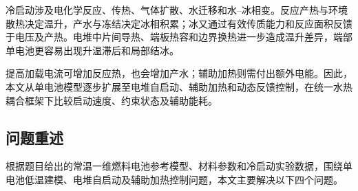 \documentclass[bwprint]{gmcmthesis}
\numberwithin{equation}{section}
\numberwithin{figure}{section}
\begin{document}
冷启动涉及电化学反应、传热、气体扩散、水迁移和水--冰相变。反应产热与环境散热决定温升，产水与冻结决定冰相积累；冰又通过有效传质能力和反应面积反馈于电压及产热。电堆中片间导热、端板热容和边界换热进一步造成温升差异，端部单电池更容易出现升温滞后和局部结冰。

提高加载电流可增加反应热，也会增加产水；辅助加热则需付出额外电能。因此，本文从单电池模型逐步扩展至电堆自启动、辅助加热和动态反馈控制，在统一水热耦合框架下比较启动速度、约束状态及辅助能耗。

\subsection{问题重述}
根据题目给出的常温一维燃料电池参考模型、材料参数和冷启动实验数据，围绕单电池低温建模、电堆自启动及辅助加热控制问题，本文主要解决以下四个问题。
\end{document}
